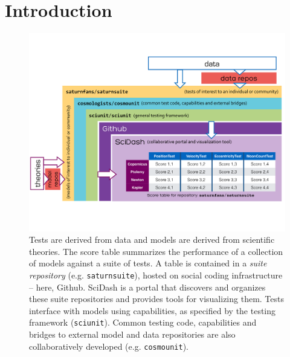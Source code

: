 \documentclass[9pt]{sig-alternate}
\begin{document}


%

\section{Introduction}
\begin{figure}[t]
\vspace{-30px}
\centering
\includegraphics[scale=0.45]{diagram1.pdf}
\vspace{-40px}
\caption{Tests are derived from data and models are derived from scientific theories. The score table summarizes the performance of a collection of models against a suite of tests. A table is contained in a \emph{suite repository} (e.g. \texttt{saturnsuite}), hosted on social coding infrastructure -- here, Github. SciDash is a portal that discovers and organizes these suite repositories  and provides tools for visualizing them. Tests interface with models using capabilities, as specified by the testing framework (\texttt{sciunit}). Common testing code, capabilities and bridges to external model and data repositories are also collaboratively developed (e.g. \texttt{cosmounit}).}  
\label{fig:sciunit_overview}
\end{figure}
\end{document}
